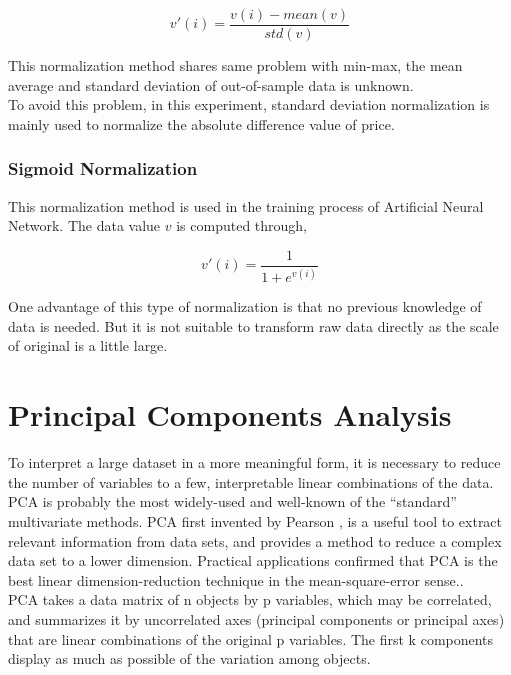 \begin{equation}
v'(i)=\frac{v(i)-mean(v)}{std(v)}
\end{equation}


This normalization method shares same problem with min-max, the mean average and standard deviation of out-of-sample data is unknown. \\


To avoid this problem, in this experiment, standard deviation normalization is mainly used to normalize the absolute difference value of price.


\subsubsection{Sigmoid Normalization\cite{nayak2014impact}}
This normalization method is used in the training process of Artificial Neural Network. The data value $v$ is computed through,


\begin{equation}
v'(i)=\frac{1}{1+e^{v(i)}}
\end{equation}

One advantage of this type of normalization is that no previous knowledge of data is needed. But it is not suitable to transform raw data directly as the scale of original is a little large.

\section{Principal Components Analysis}

To interpret a large dataset in a more meaningful form, it is necessary to reduce the number of variables to a few, interpretable linear combinations of the data. PCA is probably the most widely-used and well-known of the “standard” multivariate methods. PCA first invented by Pearson \cite{peason1901lines}, is a useful tool to extract relevant information from data sets, and provides a method to reduce a complex data set to a lower dimension. Practical applications confirmed that PCA is the best linear dimension-reduction technique in the mean-square-error sense.\cite{4_kantardzic}. \\

PCA takes a data matrix of n objects by p variables, which may be correlated, and summarizes it by uncorrelated axes (principal components or principal axes) that are linear combinations of the original p variables. The first k components display as much as possible of the variation among objects.


